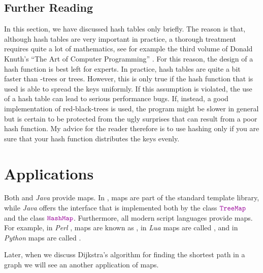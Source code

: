 \subsection{Further Reading}
In this section, we have discussed hash tables only briefly.  The reason is that, although hash tables are very
important in practice, a thorough treatment requires quite a lot of mathematics, see for example the
third volume of Donald Knuth's ``The Art of Computer Programming'' \cite{knuth:1998b}.  For this
reason, the design of a hash function is best left for experts.  In practice, hash tables are
quite a bit faster than -trees or  trees.  However, this is only true if
the hash function that is used is able to spread the keys uniformly.  If this assumption is
violated, the use of a hash table can lead to serious performance 
bugs.  If, instead, a good
implementation of red-black-trees is used, the program might be slower in general but is certain to
be protected from the ugly surprises that can result from a poor hash function.  My advice for the reader
therefore is to use hashing only if you are sure that your hash function distributes the keys evenly.


\section{Applications}
Both  and \textsl{Java} provide maps.  In , maps are part of the standard
template library, while \textsl{Java} offers the interface  that is implemented both by
the class $\mytt{TreeMap}$ and the class $\mytt{HashMap}$. Furthermore, all modern script languages provide maps.
For example, in \textsl{Perl} \cite{Wall92}, maps are known as , in \textsl{Lua} 
\cite{ierusalimschy:2006,Ieru96a} maps are called , and in \textsl{Python} 
\cite{vanRossum:95,lutz:09} maps are called .  

Later, when we discuss Dijkstra's algorithm for finding the shortest path in a graph we will see an
another application of maps.
\pagebreak

